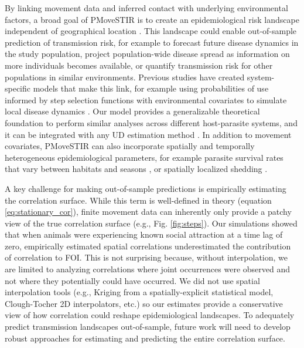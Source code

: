 \documentclass[letterpaper]{article}
\begin{document}
By linking movement data and inferred contact with underlying environmental factors, a broad goal of PMoveSTIR is to create an epidemiological risk landscape independent of geographical location \citep{Manlove2022}. This landscape could enable out-of-sample prediction of transmission risk, for example to forecast future disease dynamics in the study population, project population-wide disease spread as information on more individuals becomes available, or quantify transmission risk for other populations in similar environments. Previous studies have created system-specific models that make this link, for example using probabilities of use informed by step selection functions with environmental covariates to simulate local disease dynamics \citep{Merkle2018}. Our model provides a generalizable theoretical foundation to perform similar analyses across different host-parasite systems, and it can be integrated with any UD estimation method \citep{Signer2017,Merkle2018,Michelot2020,Potts2023}. In addition to movement covariates, PMoveSTIR can also incorporate spatially and temporally heterogeneous epidemiological parameters, for example parasite survival rates that vary between habitats and seasons \citep{Daversa2017}, or spatially localized shedding \citep{Weinstein2018a}. 

A key challenge for making out-of-sample predictions is empirically estimating the correlation surface.  While this term is well-defined in theory (equation \ref{eq:stationary_cor}), finite movement data can inherently only provide a patchy view of the true correlation surface (e.g., Fig. \ref{fig:steps}).  Our simulations showed that when animals were experiencing known social attraction at a time lag of zero, empirically estimated spatial correlations underestimated the contribution of correlation to FOI. This is not surprising because, without interpolation, we are limited to analyzing correlations where joint occurrences were observed and not where they potentially could have occurred. We did not use spatial interpolation tools (e.g., Kriging from a spatially-explicit statistical model, Clough-Tocher 2D interpolators, etc.) so our estimates provide a conservative view of how correlation could reshape epidemiological landscapes.  To adequately predict transmission landscapes out-of-sample, future work will need to develop robust approaches for estimating and predicting the entire correlation surface. 
\end{document}
